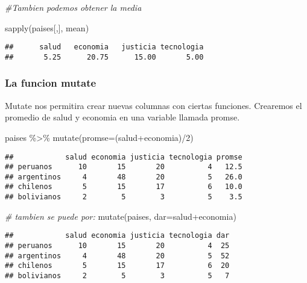 \documentclass[
]{article}
\newenvironment{Shaded}{\begin{snugshade}}{\end{snugshade}}
\newcommand{\AttributeTok}[1]{\textcolor[rgb]{0.77,0.63,0.00}{#1}}
\newcommand{\CommentTok}[1]{\textcolor[rgb]{0.56,0.35,0.01}{\textit{#1}}}
\newcommand{\DecValTok}[1]{\textcolor[rgb]{0.00,0.00,0.81}{#1}}
\newcommand{\FunctionTok}[1]{\textcolor[rgb]{0.00,0.00,0.00}{#1}}
\newcommand{\NormalTok}[1]{#1}
\newcommand{\SpecialCharTok}[1]{\textcolor[rgb]{0.00,0.00,0.00}{#1}}
\begin{document}
\begin{Shaded}
\begin{Highlighting}[]
\CommentTok{\#Tambien podemos obtener la media}

\FunctionTok{sapply}\NormalTok{(paises[,], mean)}
\end{Highlighting}
\end{Shaded}

\begin{verbatim}
##      salud   economia   justicia tecnologia 
##       5.25      20.75      15.00       5.00
\end{verbatim}

\hypertarget{la-funcion-mutate}{%
\subsubsection{La funcion mutate}\label{la-funcion-mutate}}

Mutate nos permitira crear nuevas columnas con ciertas funciones.
Crearemos el promedio de salud y economia en una variable llamada
promse.

\begin{Shaded}
\begin{Highlighting}[]
\NormalTok{paises }\SpecialCharTok{\%\textgreater{}\%}
  \FunctionTok{mutate}\NormalTok{(}\AttributeTok{promse=}\NormalTok{(salud}\SpecialCharTok{+}\NormalTok{economia)}\SpecialCharTok{/}\DecValTok{2}\NormalTok{)}
\end{Highlighting}
\end{Shaded}

\begin{verbatim}
##            salud economia justicia tecnologia promse
## peruanos      10       15       20          4   12.5
## argentinos     4       48       20          5   26.0
## chilenos       5       15       17          6   10.0
## bolivianos     2        5        3          5    3.5
\end{verbatim}

\begin{Shaded}
\begin{Highlighting}[]
\CommentTok{\# tambien se puede por:}
\FunctionTok{mutate}\NormalTok{(paises, }\AttributeTok{dar=}\NormalTok{salud}\SpecialCharTok{+}\NormalTok{economia)}
\end{Highlighting}
\end{Shaded}

\begin{verbatim}
##            salud economia justicia tecnologia dar
## peruanos      10       15       20          4  25
## argentinos     4       48       20          5  52
## chilenos       5       15       17          6  20
## bolivianos     2        5        3          5   7
\end{verbatim}
\end{document}
